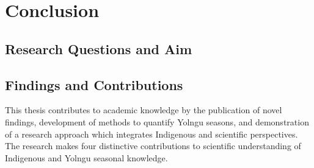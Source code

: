 \chapter{Conclusion}
\label{ch:conclusion}


\section{Research Questions and Aim}




\section{Findings and Contributions}

This thesis contributes to academic knowledge by the publication of novel
findings, development of methods to quantify Yolngu seasons, and demonstration
of a research approach which integrates Indigenous and scientific perspectives.
The research makes four distinctive contributions to scientific understanding
of Indigenous and Yolngu seasonal knowledge.


